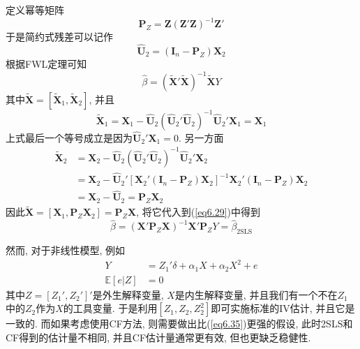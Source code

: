 \documentclass[cn, 12pt, math=mtpro2, bibstyle=apa, blue, twocol]{elegantbook}
\newcommand{\E}{\mathbb{E}}
\newcommand{\X}{\mathbold{X}}
\newcommand{\Z}{\mathbold{Z}}
\newcommand{\hb}{\hat{\beta}}
\begin{document}
定义幂等矩阵
$$\mathbold{P}_Z=\Z(\Z'\Z)^{-1}\Z'$$
于是简约式残差可以记作
$$\hat{\mathbold{U}}_2=(\mathbold{I}_n-\mathbold{P}_Z)\X_2$$
根据FWL定理可知
\begin{equation}\label{eq6.29}
  \hb=(\tilde{\X}'\tilde{\X})^{-1}\tilde{\X}Y
\end{equation}
其中$\tilde{\X}=[\tilde{\X}_1,\tilde{\X}_2]$, 并且
$$\tilde{\X}_1=\X_1-\hat{\mathbold{U}}_2(\hat{\mathbold{U}}_2'\hat{\mathbold{U}}_2)^{-1}\hat{\mathbold{U}}_2'\X_1=\X_1$$
上式最后一个等号成立是因为$\hat{\mathbold{U}}_2'\X_1=0$. 另一方面
\begin{align*}
\tilde{\X}_2&=\X_2-\hat{\mathbold{U}}_2(\hat{\mathbold{U}}_2'\hat{\mathbold{U}}_2)^{-1}\hat{\mathbold{U}}_2'\X_2 \\
&=\X_2-\hat{\mathbold{U}}_2'[\X_2'(\mathbold{I}_n-\mathbold{P}_Z)\X_2]^{-1}\X_2'(\mathbold{I}_n-\mathbold{P}_Z)\X_2 \\
&=\X_2-\hat{\mathbold{U}}_2=\mathbold{P}_Z\X_2
\end{align*}
因此$\tilde{\X}=[\X_1,\mathbold{P}_Z\X_2]=\mathbold{P}_Z\X$, 将它代入到(\ref{eq6.29})中得到
$$\hb=(\X'\mathbold{P}_Z\X)^{-1}\X'\mathbold{P}_ZY=\hb_{\text{2SLS}}$$

然而, 对于非线性模型, 例如
\begin{align}
Y&=Z_1'\delta+\alpha_1X+\alpha_2X^2+e \nonumber \\
\E[e|Z]&=0 \label{eq6.35}
\end{align}
其中$Z=[Z_1',Z_2']'$是外生解释变量, $X$是内生解释变量, 并且我们有一个不在$Z_1$中的$Z_2$作为$X$的工具变量. 于是利用$[Z_1,Z_2,Z_2^2]$即可实施标准的IV估计, 并且它是一致的. 而如果考虑使用CF方法, 则需要做出比(\ref{eq6.35})更强的假设, 此时2SLS和CF得到的估计量不相同, 并且CF估计量通常更有效, 但也更缺乏稳健性.
\end{document}

